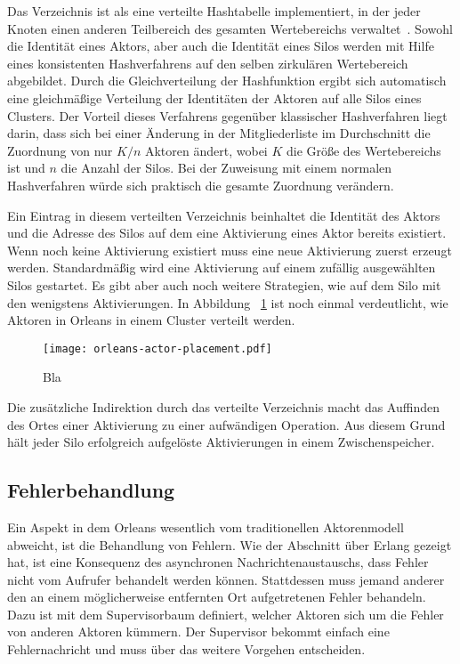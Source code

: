 Das Verzeichnis ist als eine verteilte Hashtabelle implementiert, in der jeder Knoten einen anderen Teilbereich des gesamten Wertebereichs verwaltet~\cite{Stoica:2001:CSP:383059.383071}. Sowohl die Identität eines Aktors, aber auch die Identität eines Silos werden mit Hilfe eines konsistenten Hashverfahrens auf den selben zirkulären Wertebereich abgebildet. Durch die Gleichverteilung der Hashfunktion ergibt sich automatisch eine gleichmäßige Verteilung der Identitäten der Aktoren auf alle Silos eines Clusters. Der Vorteil dieses Verfahrens gegenüber klassischer Hashverfahren liegt darin, dass sich bei einer Änderung in der Mitgliederliste im Durchschnitt die Zuordnung von nur $K/n$ Aktoren ändert, wobei $K$ die Größe des Wertebereichs ist und $n$ die Anzahl der Silos. Bei der Zuweisung mit einem normalen Hashverfahren würde sich praktisch die gesamte Zuordnung verändern.

Ein Eintrag in diesem verteilten Verzeichnis beinhaltet die Identität des Aktors und die Adresse des Silos auf dem eine Aktivierung eines Aktor bereits existiert. Wenn noch keine Aktivierung existiert muss eine neue Aktivierung zuerst erzeugt werden. Standardmäßig wird eine Aktivierung auf einem zufällig ausgewählten Silos gestartet. Es gibt aber auch noch weitere Strategien, wie \zB auf dem Silo mit den wenigstens Aktivierungen. In Abbildung ~\ref{fig:orleans-acor-placement} ist noch einmal verdeutlicht, wie Aktoren in Orleans in einem Cluster verteilt werden.

\begin{figure}[!hbt]%
\texttt{[image: orleans-actor-placement.pdf]}%
\caption{Bla}%
\label{fig:orleans-acor-placement}%
\end{figure}

Die zusätzliche Indirektion durch das verteilte Verzeichnis macht das Auffinden des Ortes einer Aktivierung zu einer aufwändigen Operation. Aus diesem Grund hält jeder Silo erfolgreich aufgelöste Aktivierungen in einem Zwischenspeicher.

\subsection{Fehlerbehandlung}

Ein Aspekt in dem Orleans wesentlich vom traditionellen Aktorenmodell abweicht, ist die Behandlung von Fehlern. Wie der Abschnitt über Erlang gezeigt hat, ist eine Konsequenz des asynchronen Nachrichtenaustauschs, dass Fehler nicht vom Aufrufer behandelt werden können. Stattdessen muss jemand anderer den an einem möglicherweise entfernten Ort aufgetretenen Fehler behandeln. Dazu ist mit dem Supervisorbaum definiert, welcher Aktoren sich um die Fehler von anderen Aktoren kümmern. Der Supervisor bekommt einfach eine Fehlernachricht und muss über das weitere Vorgehen entscheiden.

